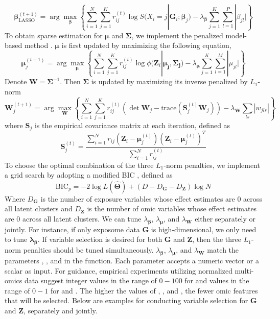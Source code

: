 \begin{equation}
     \bm{\beta}_{\text{LASSO}}^{(t+1)} = \arg \max_{\bm{\beta}} \left\{ \sum_{i = 1}^N \sum_{j = 1}^K r_{ij}^{(t)}\log S(X_i = j | \bm{G}_i; \bm{\beta}_j) - \lambda_{\bm{\beta}}\sum_{j = 1}^K\sum_{l = 1}^P |\beta_{jl}| \right\}
     \label{eq14}
\end{equation}
To obtain sparse estimation for $\bm \mu$ and $\bm \Sigma$, we implement the penalized model-based method \citep{zhou2009penalized}. $\bm \mu$ is first updated by maximizing the following equation,
\begin{equation}
    \bm{\mu}_j^{(t+1)} = \arg \max_{\bm \mu} \left \{ \sum_{i = 1}^N \sum_{j = 1}^K r_{ij}^{(t)}\log \phi(\bm{Z}_i| \bm{\mu_j}, \bm{\Sigma_j}) - \lambda_{\bm{\mu}}\sum_{j = 1}^K\sum_{l = 1}^M |\mu_{jl}| \right \}
    \label{eq15}
\end{equation}
Denote $\bm{W} = \bm{\Sigma}^{-1}$. Then $\bm \Sigma$ is updated by maximizing its inverse penalized by $L_1$-norm
\begin{equation}
    \bm{W}_j^{(t+1)} = \arg \max_{\bm W} \left \{ \sum_{i = 1}^N \sum_{j = 1}^K r_{ij}^{(t)}\left( \det \bm{W}_j - \text{trace}(\bm{S}_j^{(t)} \bm{W}_j) \right) - \lambda_{\bm{W}}\sum_{ls}|w_{jls}| \right \}
    \label{eq16}
\end{equation}
where $\bm S_j$ is the empirical covariance matrix at each iteration, defined as
\begin{equation}
    \bm{S}_j^{(t)} = \frac{\sum_{i=1}^N r_{ij}\left(\bm{Z}_i - \bm{\mu}_j^{(t)}\right)\left(\bm{Z}_i - \bm{\mu}_j^{(t)}\right)^T}{\sum_{i=1}^N r_{ij}^{(t)}}
    \label{eq17}
\end{equation}
To choose the optimal combination of the three $L_1$-norm penalties, we implement a grid search by adopting a modified BIC \citep{pan2007penalized}, defined as
\begin{equation}
    \text{BIC}_p = -2 \log L(\hat{\bm \Theta}) + (D - D_{\bm G} - D_{\bm Z})\log N
    \label{eq18}
\end{equation}
Where $D_{\bm G}$ is the number of exposure variables whose effect estimates are 0 across all latent clusters and $D_{\bm Z}$ is the number of omic variables whose effect estimates are 0 across all latent clusters. We can tune $\lambda_{\bm \beta}$, $\lambda_{\bm \mu}$, and $\lambda_{\bm W}$ either separately or jointly. For instance, if only exposome data $\bm G$ is high-dimensional, we only need to tune $\bm \lambda_{\bm \beta}$. If variable selection is desired for both $\bm G$ and $\bm Z$, then the three $L_1$-norm penalties should be tuned simultaneously. $\lambda_{\bm \beta}$, $\lambda_{\bm \mu}$, and $\lambda_{\bm W}$ match the parameters , , and  in the  function. Each parameter accepts a numeric vector or a scalar as input. For guidance, empirical experiments utilizing normalized multi-omics data suggest integer values in the range of $0 - 100$ for  and values in the range of $0 - 1$ for  and . The higher the values of , , and , the fewer omic features that will be selected. Below are examples for conducting variable selection for $\bm G$ and $\bm Z$, separately and jointly.
